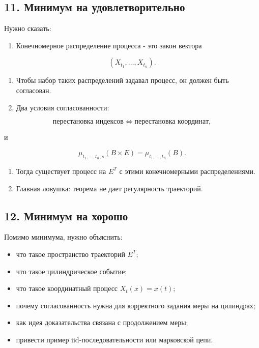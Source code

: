 \documentclass[
  11pt,
  a4paper,
]{article}
\providecommand{\tightlist}{%
  \setlength{\itemsep}{0pt}\setlength{\parskip}{0pt}}
\begin{document}
\subsection{11. Минимум на
удовлетворительно}\label{ux43cux438ux43dux438ux43cux443ux43c-ux43dux430-ux443ux434ux43eux432ux43bux435ux442ux432ux43eux440ux438ux442ux435ux43bux44cux43dux43e}

Нужно сказать:

\begin{enumerate}
\def\labelenumi{\arabic{enumi}.}
\tightlist
\item
  Конечномерное распределение процесса - это закон вектора
\end{enumerate}

\[
(X_{t_1},\ldots,X_{t_n}).
\]

\begin{enumerate}
\def\labelenumi{\arabic{enumi}.}
\setcounter{enumi}{1}
\item
  Чтобы набор таких распределений задавал процесс, он должен быть
  согласован.
\item
  Два условия согласованности:
\end{enumerate}

\[
\text{перестановка индексов} \Longleftrightarrow \text{перестановка координат},
\]

и

\[
\mu_{t_1,\ldots,t_n,s}(B\times E)
=
\mu_{t_1,\ldots,t_n}(B).
\]

\begin{enumerate}
\def\labelenumi{\arabic{enumi}.}
\setcounter{enumi}{3}
\item
  Тогда существует процесс на \(E^T\) с этими конечномерными
  распределениями.
\item
  Главная ловушка: теорема не дает регулярность траекторий.
\end{enumerate}

\subsection{12. Минимум на
хорошо}\label{ux43cux438ux43dux438ux43cux443ux43c-ux43dux430-ux445ux43eux440ux43eux448ux43e}

Помимо минимума, нужно объяснить:

\begin{itemize}
\tightlist
\item
  что такое пространство траекторий \(E^T\);
\item
  что такое цилиндрическое событие;
\item
  что такое координатный процесс \(X_t(x)=x(t)\);
\item
  почему согласованность нужна для корректного задания меры на
  цилиндрах;
\item
  как идея доказательства связана с продолжением меры;
\item
  привести пример iid-последовательности или марковской цепи.
\end{itemize}
\end{document}

